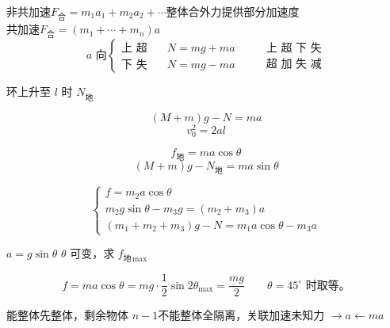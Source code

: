 \noindent 非共加速\quad $F_{\text{合}}=m_1a_1+m_2a_2+\cdots$\quad 整体合外力提供部分加速度 \\
共加速\quad $F_{\text{合}}=(m_1+\cdots+m_n)a$
\[ a\text{ 向}\left\{\begin{array}{ll}\text{上 超}&\quad N=mg+ma\\ \text{下 失}&\quad N=mg-ma\end{array}\right.\qquad \begin{array}{l}\text{上 超 下 失}\\ \text{超 加 失 减}\end{array} \]
\begin{problem}
环上升至 $l$ 时 $N_{\text{地}}$
\begin{solution}
\[ (M+m)g-N=ma \]
\[ v_0^2=2al \]
\end{solution}
\end{problem}
\begin{problem}
\begin{solution}
\[ f_{\text{地}}=ma\cos\theta \]
\[ (M+m)g-N_{\text{地}}=ma\sin\theta \]
\end{solution}
\end{problem}
\begin{problem}
\begin{solution}
\[ \begin{cases} f=m_2a\cos\theta\\ m_2g\sin\theta-m_3g=(m_2+m_3)a\\ (m_1+m_2+m_3)g-N=m_1a\cos\theta-m_3a\end{cases} \]
\end{solution}
\end{problem}
\begin{problem}
$a=g\sin\theta$
$\theta$ 可变，求 $f_{\text{地}\,\max}$
\begin{solution}
\[ f=ma\cos\theta=mg\cdot\frac12\sin2\theta_{\max}=\frac{mg}{2}\qquad \theta=45^\circ\text{ 时取等。} \]
\end{solution}
\end{problem}
\noindent 能整体先整体，剩余物体 $n-1$\quad 不能整体全隔离，关联加速未知力
\noindent $\to a$\quad $\leftarrow ma$


